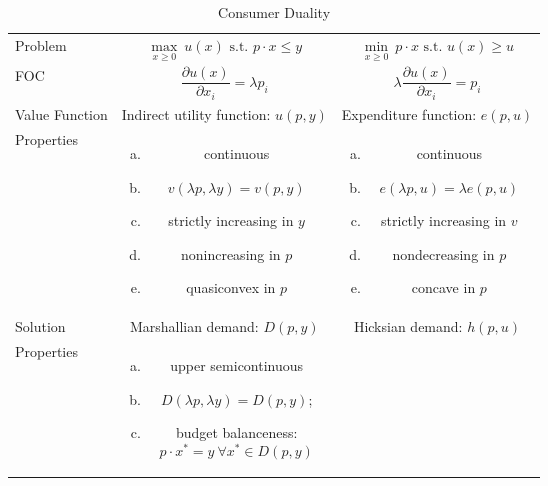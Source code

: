 \documentclass{article}
\begin{document}
\begin{table}
  \caption{Consumer Duality}
  \begin{tabular}{lcc}
     \hline\hline
      Problem
       & $\underset{x \geq 0}{\max}\ u(x) \textrm{ s.t. } p \cdot x \leq y$
       & $\underset{x \geq 0}{\min}\ p \cdot x \textrm{ s.t. } u(x) \geq u$
      \\
      FOC & $\dfrac{\partial u(x)}{\partial x_i} = \lambda p_i$
          & $\lambda\dfrac{\partial u(x)}{\partial x_i} = p_i$
      \\\hline
      Value Function & Indirect utility function: $u(p,y)$
                     & Expenditure function: $e(p,u)$
      \\
      Properties
          & \parbox{.35\textwidth}{
              \begin{enumerate}[(a)]
                \item continuous
                \item $v(\lambda p, \lambda y) = v(p,y)$
                \item strictly increasing in $y$
                \item nonincreasing in $p$
                \item quasiconvex in $p$
              \end{enumerate}
          }
          & \parbox{.35\textwidth}{
              \begin{enumerate}[(a)]
                \item continuous
                \item $e(\lambda p,u) = \lambda e(p,u)$
                \item strictly increasing in $v$
                \item nondecreasing in $p$
                \item concave in $p$
              \end{enumerate}
          }
      \\\hline
      Solution & Marshallian demand: $D(p,y)$ & Hicksian demand: $h(p,u)$
      \\
      Properties
          & \parbox{.35\textwidth}{
              \begin{enumerate}[(a)]
                \item upper semicontinuous
                \item $D(\lambda p, \lambda y) = D(p,y)$;
                \item budget balanceness:
                      $$p \cdot x^* = y\ \forall x^* \in D(p,y)$$

\end{enumerate}}
\end{tabular}
\end{table}
\end{document}
